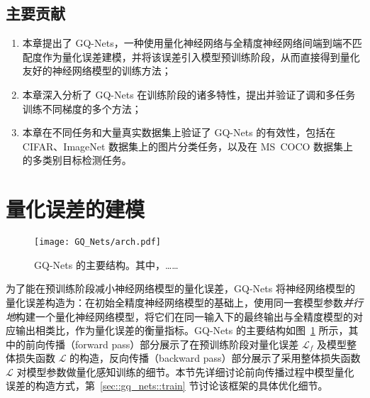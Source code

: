 \subsection{主要贡献}
\begin{enumerate}[1.]
  \item 本章提出了 GQ-Nets，一种使用量化神经网络与全精度神经网络间端到端不匹配度作为量化误差建模，并将该误差引入模型预训练阶段，从而直接得到量化友好的神经网络模型的训练方法；
  \item 本章深入分析了 GQ-Nets 在训练阶段的诸多特性，提出并验证了调和多任务训练不同梯度的多个方法；
  \item 本章在不同任务和大量真实数据集上验证了 GQ-Nets 的有效性，包括在 CIFAR、ImageNet 数据集上的图片分类任务，以及在 MS~COCO  数据集上的多类别目标检测任务。
\end{enumerate}
\section{量化误差的建模} \label{sec::gq_nets::q_error}

\begin{figure}[htb]
  \centering
  \texttt{[image: GQ\_Nets/arch.pdf]}
  \caption{GQ-Nets 的主要结构。其中，……}
  \label{img::gq_nets::arch}
\end{figure}

为了能在预训练阶段减小神经网络模型的量化误差，GQ-Nets 将神经网络模型的量化误差构造为：在初始全精度神经网络模型的基础上，使用同一套模型参数\emph{并行地}构建一个量化神经网络模型，将它们在同一输入下的最终输出与全精度模型的对应输出相类比，作为量化误差的衡量指标。GQ-Nets 的主要结构如图~\ref{img::gq_nets::arch} 所示，其中的前向传播（forward pass）部分展示了在预训练阶段对量化误差 $\mathcal{L}_f$ 及模型整体损失函数 $\mathcal{L}$ 的构造，反向传播（backward pass）部分展示了采用整体损失函数 $\mathcal{L}$ 对模型参数做量化感知训练的细节。本节先详细讨论前向传播过程中模型量化误差的构造方式，第~\ref{sec::gq_nets::train} 节讨论该框架的具体优化细节。

